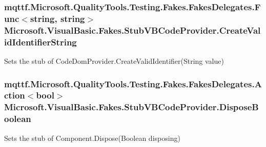 \hypertarget{class_microsoft_1_1_visual_basic_1_1_fakes_1_1_stub_v_b_code_provider_af4bb0579a49ee6625a2ddd8fd66443b4}{
\subsubsection[{Create\-Valid\-Identifier\-String}]{\setlength{\rightskip}{0pt plus 5cm}mqttf.\-Microsoft.\-Quality\-Tools.\-Testing.\-Fakes.\-Fakes\-Delegates.\-Func$<$string, string$>$ Microsoft.\-Visual\-Basic.\-Fakes.\-Stub\-V\-B\-Code\-Provider.\-Create\-Valid\-Identifier\-String}}\label{class_microsoft_1_1_visual_basic_1_1_fakes_1_1_stub_v_b_code_provider_af4bb0579a49ee6625a2ddd8fd66443b4}


Sets the stub of Code\-Dom\-Provider.\-Create\-Valid\-Identifier(\-String value)

\hypertarget{class_microsoft_1_1_visual_basic_1_1_fakes_1_1_stub_v_b_code_provider_ab98298661bb4094b7f0c9af52a1408af}{
\subsubsection[{Dispose\-Boolean}]{\setlength{\rightskip}{0pt plus 5cm}mqttf.\-Microsoft.\-Quality\-Tools.\-Testing.\-Fakes.\-Fakes\-Delegates.\-Action$<$bool$>$ Microsoft.\-Visual\-Basic.\-Fakes.\-Stub\-V\-B\-Code\-Provider.\-Dispose\-Boolean}}\label{class_microsoft_1_1_visual_basic_1_1_fakes_1_1_stub_v_b_code_provider_ab98298661bb4094b7f0c9af52a1408af}


Sets the stub of Component.\-Dispose(\-Boolean disposing)

